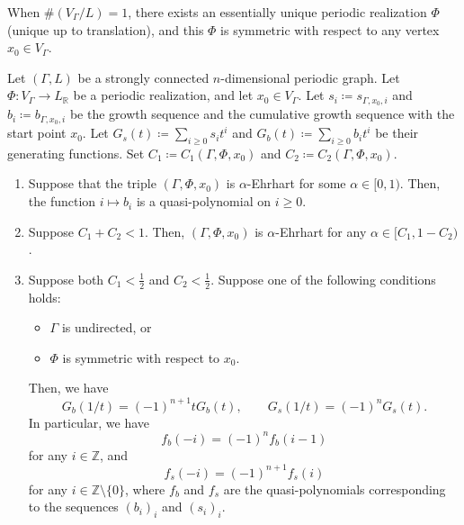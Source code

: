 \documentclass[ALCO,published]{cedram}
\theoremstyle{remark}
\begin{document}
\begin{rmk}
When $\# (V_{\Gamma} /L) = 1$, there exists an essentially unique periodic realization $\Phi$ (unique up to translation), 
and this $\Phi$ is symmetric with respect to any vertex $x_0 \in V_{\Gamma}$. 
\end{rmk}

\begin{thm}\label{thm:ET}
Let $(\Gamma , L)$ be a strongly connected $n$-dimensional periodic graph. 
Let~$\Phi\colon V_{\Gamma} \to L_{\mathbb{R}}$ be a periodic realization, and let $x_0 \in V_{\Gamma}$. 
Let $s_i \coloneqq  s_{\Gamma, x_0, i}$ and $b_i \coloneqq  b_{\Gamma, x_0, i}$ be 
the growth sequence and the cumulative growth sequence with the start point $x_0$. 
Let $G_s(t) \coloneqq  \sum _{i \ge 0} s_i t^i$ and $G_b(t) \coloneqq  \sum _{i \ge 0} b_i t^i$ be their generating functions. 
Set $C_1 \coloneqq  C_{1}(\Gamma, \Phi, x_0)$ and $C_2 \coloneqq  C_{2}(\Gamma, \Phi, x_0)$. 
\begin{enumerate}
\item 
Suppose that the triple $(\Gamma, \Phi, x_0)$ is $\alpha$-Ehrhart for some $\alpha \in [0,1)$. 
Then, the function $i \mapsto b_i$ is a quasi-polynomial on $i \ge 0$. 

\item 
Suppose $C_1 + C_2 < 1$. 
Then, $(\Gamma, \Phi, x_0)$ is $\alpha$-Ehrhart for any $\alpha \in [C_{1}, 1-C_{2})$. 

\item 
Suppose both $C_1 < \frac{1}{2}$ and $C_2 < \frac{1}{2}$. 
Suppose one of the following conditions holds: 
\begin{itemize}
\item[(i)] $\Gamma$ is undirected, or

\item[(ii)] $\Phi$ is symmetric with respect to $x_0$. 
\end{itemize}
Then, we have 
\[
G_b(1/t) = (-1)^{n+1} t G_b(t), \qquad 
G_s(1/t) = (-1)^n G_s(t). 
\]
In particular, we have 
\[
f_b(-i) = (-1)^n f_b(i-1)
\]
for any $i \in \mathbb{Z}$, and 
\[
f_s(-i) = (-1)^{n+1} f_s(i)
\]
for any $i \in \mathbb{Z} \setminus \{ 0 \}$, 
where $f_b$ and $f_s$ are the quasi-polynomials corresponding to the sequences $(b_i)_i$ and $(s_i)_i$. 
\end{enumerate}
\end{thm}
\end{document}
